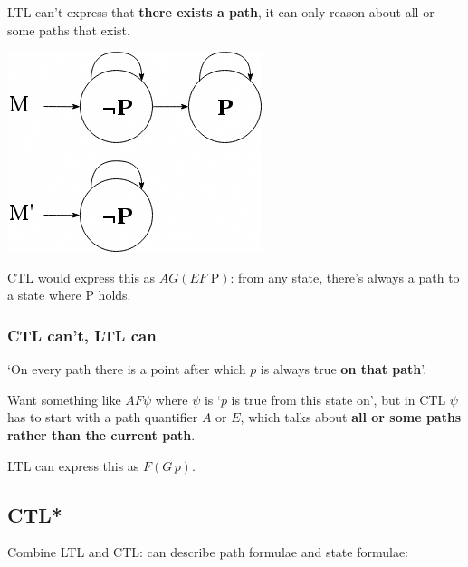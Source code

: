 \documentclass[a4paper, 11pt]{article}
\begin{document}
{{{\begin{minipage}[t]{0.7\textwidth}
            LTL can't express that \textbf{there exists a path}, it can only reason about all or some paths that exist.
            \end{minipage}
            \begin{minipage}[t]{0.25\textwidth}
            \vspace{-2pt}
            \includegraphics[width=\textwidth]{ltl-inexpressible.png}
            \end{minipage}

            CTL would express this as \(AG(EF\;\text{P})\): from any state, there's always a path to a state where P holds.
        }
        \subsubsection*{CTL can't, LTL can}
        {
            `On every path there is a point after which \(p\) is always true \textbf{on that path}'.

            Want something like \(AF\psi\) where \(\psi\) is `\(p\) is true from this state on', but in CTL \(\psi\) has to start with a path quantifier \(A\) or \(E\), which talks about \textbf{all or some paths rather than the current path}.

            LTL can express this as \(F(G\,p)\).
        }
    }
    \subsection*{CTL*}
    {
        Combine LTL and CTL: can describe path formulae and state formulae:

}}
\end{document}
